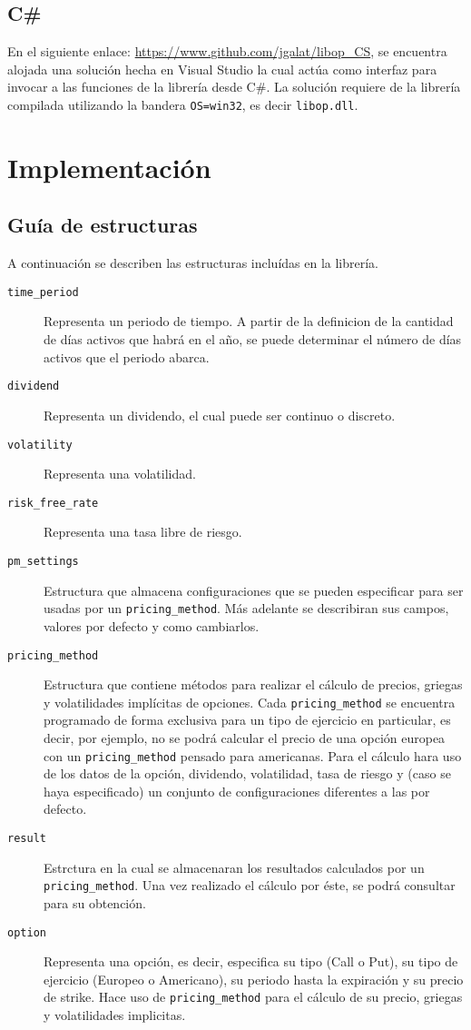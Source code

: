 \documentclass[12pt,a4paper,final]{article}
\begin{document}
	\subsection{C\#}
		En el siguiente enlace: \url{https://www.github.com/jgalat/libop_CS}, se encuentra alojada
		una solución hecha en Visual Studio la cual actúa como interfaz para invocar a las funciones
		de la librería desde C\#. La solución requiere de la librería compilada utilizando la bandera
		\texttt{OS=win32}, es decir \texttt{libop.dll}.

\section{Implementación}

	\subsection{Guía de estructuras}
		A continuación se describen las estructuras incluídas en la librería.

		\begin{description}
			\item [\texttt{time\_period}] Representa un periodo de tiempo. A partir de la definicion de
				la cantidad de días activos que habrá en el año, se puede determinar el número
				de días activos que el periodo abarca.
			\item [\texttt{dividend}] Representa un dividendo, el cual puede ser continuo o discreto.
			\item [\texttt{volatility}] Representa una volatilidad.
			\item [\texttt{risk\_free\_rate}] Representa una tasa libre de riesgo.
			\item [\texttt{pm\_settings}] Estructura que almacena configuraciones que se pueden
				especificar para ser usadas por un \texttt{pricing\_method}. Más adelante se describiran
				sus campos, valores por defecto y como cambiarlos.
			\item [\texttt{pricing\_method}] Estructura que contiene métodos para realizar el cálculo
				de precios, griegas y volatilidades implícitas de opciones. Cada \texttt{pricing\_method}
				se encuentra programado de forma exclusiva para un tipo de ejercicio en particular,
				es decir, por ejemplo, no se podrá calcular el precio de una opción europea con un
			\texttt{pricing\_method} pensado para americanas. Para el cálculo hara uso de los datos
				de la opción, dividendo, volatilidad, tasa de riesgo y (caso se haya especificado) un conjunto
				de configuraciones diferentes a las por defecto.
			\item [\texttt{result}]	Estrctura en la cual se almacenaran los resultados calculados por
				un \texttt{pricing\_method}. Una vez realizado el cálculo por éste, se podrá consultar para
				su obtención.
			\item [\texttt{option}] Representa una opción, es decir, especifica su tipo (Call o Put), su
				tipo de ejercicio (Europeo o Americano), su periodo hasta la expiración y su precio de
				strike. Hace uso de \texttt{pricing\_method} para el cálculo de su precio, griegas y
				volatilidades implicitas.
		\end{description}
\end{document}
